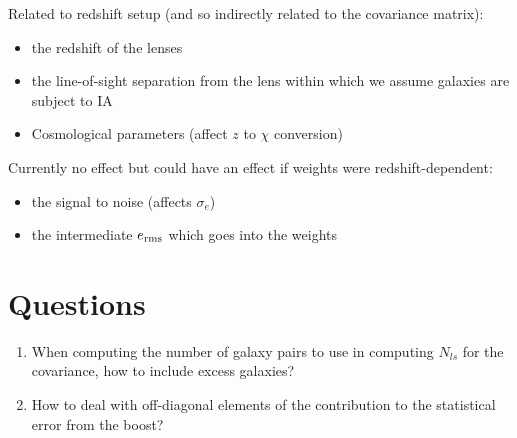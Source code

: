 \documentclass[onecolumn,amsmath,aps,fleqn, superscriptaddress]{revtex4}
\begin{document}
Related to redshift setup (and so indirectly related to the covariance matrix):
\begin{itemize}
\item{the redshift of the lenses}
\item{the line-of-sight separation from the lens within which we assume galaxies are subject to IA}
\item{Cosmological parameters (affect $z$ to $\chi$ conversion)}
\end{itemize}

Currently no effect but could have an effect if weights were redshift-dependent:
\begin{itemize}
\item{the signal to noise (affects $\sigma_e$)}
\item{the intermediate $e_{\rm rms}$ which goes into the weights}
\end{itemize}

\section*{Questions}
\begin{enumerate}
\item{When computing the number of galaxy pairs to use in computing $N_{ls}$ for the covariance, how to include excess galaxies?}
\item{How to deal with off-diagonal elements of the contribution to the statistical error from the boost?}
\end{enumerate}


\end{document}
